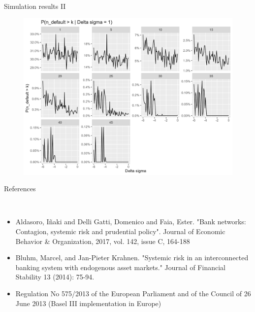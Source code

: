 \documentclass{beamer}
\begin{document}
\begin{frame}{Simulation results II}
    
    \begin{figure}[H]
        \includegraphics[scale=0.4]{more_than_plot.png}
        \centering
    \end{figure}  
      
    \end{frame}


\begin{frame}{References}

    
    \

    \begin{itemize}
        \item  Aldasoro, Iñaki and Delli Gatti, Domenico and Faia, Ester. "Bank networks: Contagion, systemic risk and prudential policy". Journal of Economic Behavior \& Organization, 2017, vol. 142, issue C, 164-188
        \item Bluhm, Marcel, and Jan-Pieter Krahnen. "Systemic risk in an interconnected banking system with endogenous asset markets." Journal of Financial Stability 13 (2014): 75-94.
        \item Regulation No 575/2013 of the European Parliament and of the Council of 26 June 2013 (Basel III implementation in Europe)
    \end{itemize}

\end{frame}

    
\end{document}
